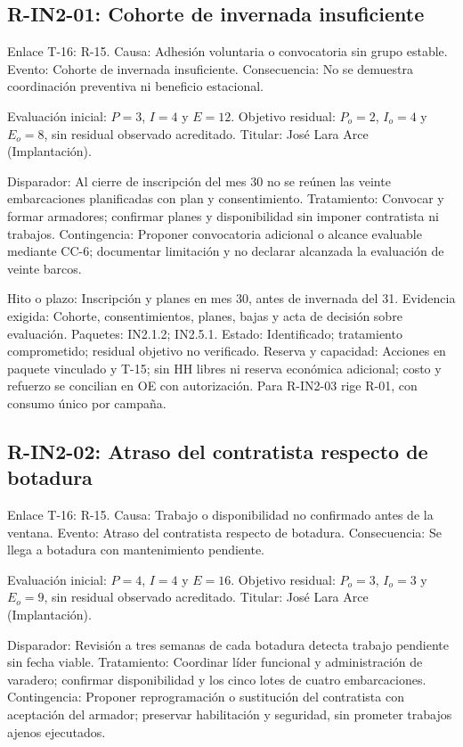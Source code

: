 \subsection{R-IN2-01: Cohorte de invernada insuficiente}
Enlace T-16: R-15. Causa: Adhesión voluntaria o convocatoria sin grupo estable. Evento: Cohorte de invernada insuficiente. Consecuencia: No se demuestra coordinación preventiva ni beneficio estacional.

Evaluación inicial: $P=3$, $I=4$ y $E=12$. Objetivo residual: $P_o=2$, $I_o=4$ y $E_o=8$, sin residual observado acreditado. Titular: José Lara Arce (Implantación).

Disparador: Al cierre de inscripción del mes 30 no se reúnen las veinte embarcaciones planificadas con plan y consentimiento. Tratamiento: Convocar y formar armadores; confirmar planes y disponibilidad sin imponer contratista ni trabajos. Contingencia: Proponer convocatoria adicional o alcance evaluable mediante CC-6; documentar limitación y no declarar alcanzada la evaluación de veinte barcos.

Hito o plazo: Inscripción y planes en mes 30, antes de invernada del 31. Evidencia exigida: Cohorte, consentimientos, planes, bajas y acta de decisión sobre evaluación. Paquetes: IN2.1.2; IN2.5.1. Estado: Identificado; tratamiento comprometido; residual objetivo no verificado. Reserva y capacidad: Acciones en paquete vinculado y T-15; sin HH libres ni reserva económica adicional; costo y refuerzo se concilian en OE con autorización. Para R-IN2-03 rige R-01, con consumo único por campaña.

\subsection{R-IN2-02: Atraso del contratista respecto de botadura}
Enlace T-16: R-15. Causa: Trabajo o disponibilidad no confirmado antes de la ventana. Evento: Atraso del contratista respecto de botadura. Consecuencia: Se llega a botadura con mantenimiento pendiente.

Evaluación inicial: $P=4$, $I=4$ y $E=16$. Objetivo residual: $P_o=3$, $I_o=3$ y $E_o=9$, sin residual observado acreditado. Titular: José Lara Arce (Implantación).

Disparador: Revisión a tres semanas de cada botadura detecta trabajo pendiente sin fecha viable. Tratamiento: Coordinar líder funcional y administración de varadero; confirmar disponibilidad y los cinco lotes de cuatro embarcaciones. Contingencia: Proponer reprogramación o sustitución del contratista con aceptación del armador; preservar habilitación y seguridad, sin prometer trabajos ajenos ejecutados.

